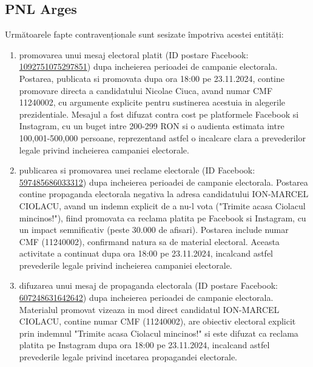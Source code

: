 \documentclass[a4paper,12pt]{article}
\begin{document}
\vspace{0.5cm}

\subsection{PNL Arges}
Următoarele fapte contravenționale sunt sesizate împotriva acestei entități:

\begin{enumerate}[leftmargin=*, label=\arabic*.)]
    \item promovarea unui mesaj electoral platit (ID postare Facebook: \href{https://www.facebook.com/ads/library/?id=1092751075297851}{1092751075297851}) dupa incheierea perioadei de campanie electorala. Postarea, publicata si promovata dupa ora 18:00 pe 23.11.2024, contine promovare directa a candidatului Nicolae Ciuca, avand numar CMF 11240002, cu argumente explicite pentru sustinerea acestuia in alegerile prezidentiale. Mesajul a fost difuzat contra cost pe platformele Facebook si Instagram, cu un buget intre 200-299 RON si o audienta estimata intre 100,001-500,000 persoane, reprezentand astfel o incalcare clara a prevederilor legale privind incheierea campaniei electorale.
    \item publicarea si promovarea unei reclame electorale (ID Facebook: \href{https://www.facebook.com/ads/library/?id=597485686033312}{597485686033312}) dupa incheierea perioadei de campanie electorala. Postarea contine propaganda electorala negativa la adresa candidatului ION-MARCEL CIOLACU, avand un indemn explicit de a nu-l vota ("Trimite acasa Ciolacul mincinos!"), fiind promovata ca reclama platita pe Facebook si Instagram, cu un impact semnificativ (peste 30.000 de afisari). Postarea include numar CMF (11240002), confirmand natura sa de material electoral. Aceasta activitate a continuat dupa ora 18:00 pe 23.11.2024, incalcand astfel prevederile legale privind incheierea campaniei electorale.
    \item difuzarea unui mesaj de propaganda electorala (ID postare Facebook: \href{https://www.facebook.com/ads/library/?id=607248631642642}{607248631642642}) dupa incheierea perioadei de campanie electorala. Materialul promovat vizeaza in mod direct candidatul ION-MARCEL CIOLACU, contine numar CMF (11240002), are obiectiv electoral explicit prin indemnul "Trimite acasa Ciolacul mincinos!" si este difuzat ca reclama platita pe Instagram dupa ora 18:00 pe 23.11.2024, incalcand astfel prevederile legale privind incetarea propagandei electorale.
\end{enumerate}
\end{document}
